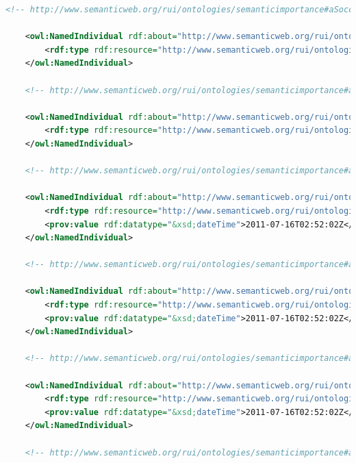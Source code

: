 \begin{lstlisting}[language=XML,caption={Semantic Importance Ontology File (update this file)}]
    <!-- http://www.semanticweb.org/rui/ontologies/semanticimportance#aSoccerOffsideRelevanceOntology -->

    <owl:NamedIndividual rdf:about="http://www.semanticweb.org/rui/ontologies/semanticimportance#aSoccerOffsideRelevanceOntology">
        <rdf:type rdf:resource="http://www.semanticweb.org/rui/ontologies/semanticimportance#QueryRelevanceOntology"/>
    </owl:NamedIndividual>

    <!-- http://www.semanticweb.org/rui/ontologies/semanticimportance#aTargetQuery -->

    <owl:NamedIndividual rdf:about="http://www.semanticweb.org/rui/ontologies/semanticimportance#aTargetQuery">
        <rdf:type rdf:resource="http://www.semanticweb.org/rui/ontologies/semanticimportance#Query"/>
    </owl:NamedIndividual>

    <!-- http://www.semanticweb.org/rui/ontologies/semanticimportance#aTimestampOfRecentQueryParticipation -->

    <owl:NamedIndividual rdf:about="http://www.semanticweb.org/rui/ontologies/semanticimportance#aTimestampOfRecentQueryParticipation">
        <rdf:type rdf:resource="http://www.semanticweb.org/rui/ontologies/semanticimportance#RecencyTimestamp"/>
        <prov:value rdf:datatype="&xsd;dateTime">2011-07-16T02:52:02Z</prov:value>
    </owl:NamedIndividual>
 
    <!-- http://www.semanticweb.org/rui/ontologies/semanticimportance#aTimestampWhenDataArrives -->

    <owl:NamedIndividual rdf:about="http://www.semanticweb.org/rui/ontologies/semanticimportance#aTimestampWhenDataArrives">
        <rdf:type rdf:resource="http://www.semanticweb.org/rui/ontologies/semanticimportance#ArrivalTimestamp"/>
        <prov:value rdf:datatype="&xsd;dateTime">2011-07-16T02:52:02Z</prov:value>
    </owl:NamedIndividual>

    <!-- http://www.semanticweb.org/rui/ontologies/semanticimportance#aTimestampWhenDataExpires -->

    <owl:NamedIndividual rdf:about="http://www.semanticweb.org/rui/ontologies/semanticimportance#aTimestampWhenDataExpires">
        <rdf:type rdf:resource="http://www.semanticweb.org/rui/ontologies/semanticimportance#ExpirationTimestamp"/>
        <prov:value rdf:datatype="&xsd;dateTime">2011-07-16T02:52:02Z</prov:value>
    </owl:NamedIndividual>

    <!-- http://www.semanticweb.org/rui/ontologies/semanticimportance#aTimestampWhenDataIsGenerated -->


\end{lstlisting}
